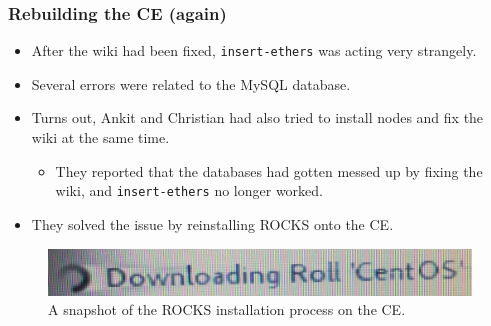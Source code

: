 \documentclass{beamer}
\begin{document}
\begin{frame}

  \frametitle{Rebuilding the CE (again)}

  \begin{itemize}
    \item After the wiki had been fixed, {\tt insert-ethers} was acting very
      strangely.
    \item Several errors were related to the MySQL database.
    \item Turns out, Ankit and Christian had also tried to install nodes and fix
      the wiki at the same time.
      \begin{itemize}
        \item They reported that the databases had gotten messed up by fixing
          the wiki, and {\tt insert-ethers} no longer worked.
      \end{itemize}
    \item They solved the issue by reinstalling ROCKS onto the CE.
  \end{itemize}

  \begin{figure}[H]
    \begin{center}
      \includegraphics[scale=0.1]{reinstall.JPG}
    \end{center}
    \caption{A snapshot of the ROCKS installation process on the CE.}
  \end{figure}

\end{frame}

\end{document}
